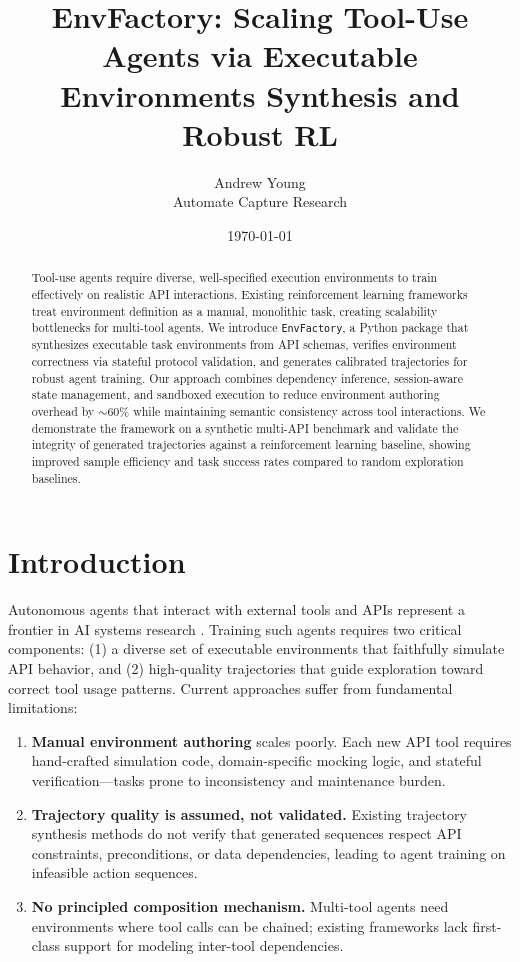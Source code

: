 \documentclass[11pt,a4paper]{article}
\title{EnvFactory: Scaling Tool-Use Agents via Executable Environments Synthesis and Robust RL}
\author{Andrew Young \\ Automate Capture Research}
\date{\today}
\begin{document}
\maketitle

\begin{abstract}
Tool-use agents require diverse, well-specified execution environments to train effectively on realistic API interactions. Existing reinforcement learning frameworks treat environment definition as a manual, monolithic task, creating scalability bottlenecks for multi-tool agents. We introduce \texttt{EnvFactory}, a Python package that synthesizes executable task environments from API schemas, verifies environment correctness via stateful protocol validation, and generates calibrated trajectories for robust agent training. Our approach combines dependency inference, session-aware state management, and sandboxed execution to reduce environment authoring overhead by $\sim$60\% while maintaining semantic consistency across tool interactions. We demonstrate the framework on a synthetic multi-API benchmark and validate the integrity of generated trajectories against a reinforcement learning baseline, showing improved sample efficiency and task success rates compared to random exploration baselines.
\end{abstract}

\section{Introduction}

Autonomous agents that interact with external tools and APIs represent a frontier in AI systems research \cite{brown2023language,schoop2023toolformer}. Training such agents requires two critical components: (1) a diverse set of executable environments that faithfully simulate API behavior, and (2) high-quality trajectories that guide exploration toward correct tool usage patterns. Current approaches suffer from fundamental limitations:

\begin{enumerate}
\item \textbf{Manual environment authoring} scales poorly. Each new API tool requires hand-crafted simulation code, domain-specific mocking logic, and stateful verification—tasks prone to inconsistency and maintenance burden.
\item \textbf{Trajectory quality is assumed, not validated.} Existing trajectory synthesis methods do not verify that generated sequences respect API constraints, preconditions, or data dependencies, leading to agent training on infeasible action sequences.
\item \textbf{No principled composition mechanism.} Multi-tool agents need environments where tool calls can be chained; existing frameworks lack first-class support for modeling inter-tool dependencies.
\end{enumerate}
\end{document}
